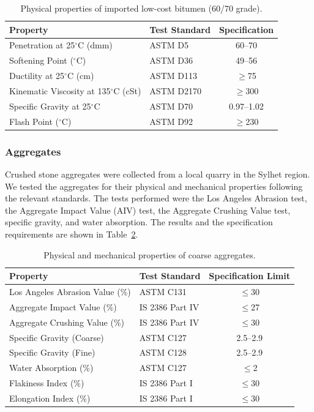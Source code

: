\documentclass[12pt,a4paper]{article}
\begin{document}
\begin{table}[htbp]
    \centering
    \caption{Physical properties of imported low-cost bitumen (60/70 grade).}
    \label{tab:imported_bitumen}
    \begin{tabular}{@{}llc@{}}
        \toprule
        \textbf{Property} & \textbf{Test Standard} & \textbf{Specification} \\
        \midrule
        Penetration at 25$^{\circ}$C (dmm) & ASTM D5 & 60--70 \\
        Softening Point ($^{\circ}$C) & ASTM D36 & 49--56 \\
        Ductility at 25$^{\circ}$C (cm) & ASTM D113 & $\geq$75 \\
        Kinematic Viscosity at 135$^{\circ}$C (cSt) & ASTM D2170 & $\geq$300 \\
        Specific Gravity at 25$^{\circ}$C & ASTM D70 & 0.97--1.02 \\
        Flash Point ($^{\circ}$C) & ASTM D92 & $\geq$230 \\
        \bottomrule
    \end{tabular}
\end{table}

\subsubsection{Aggregates}

Crushed stone aggregates were collected from a local quarry in the Sylhet region. We tested the aggregates for their physical and mechanical properties following the relevant standards. The tests performed were the Los Angeles Abrasion test, the Aggregate Impact Value (AIV) test, the Aggregate Crushing Value test, specific gravity, and water absorption. The results and the specification requirements are shown in Table~\ref{tab:agg_properties}.

\begin{table}[htbp]
    \centering
    \caption{Physical and mechanical properties of coarse aggregates.}
    \label{tab:agg_properties}
    \begin{tabular}{@{}llc@{}}
        \toprule
        \textbf{Property} & \textbf{Test Standard} & \textbf{Specification Limit} \\
        \midrule
        Los Angeles Abrasion Value (\%) & ASTM C131 & $\leq$30 \\
        Aggregate Impact Value (\%) & IS 2386 Part IV & $\leq$27 \\
        Aggregate Crushing Value (\%) & IS 2386 Part IV & $\leq$30 \\
        Specific Gravity (Coarse) & ASTM C127 & 2.5--2.9 \\
        Specific Gravity (Fine) & ASTM C128 & 2.5--2.9 \\
        Water Absorption (\%) & ASTM C127 & $\leq$2 \\
        Flakiness Index (\%) & IS 2386 Part I & $\leq$30 \\
        Elongation Index (\%) & IS 2386 Part I & $\leq$30 \\
        \bottomrule
    \end{tabular}
\end{table}
\end{document}
